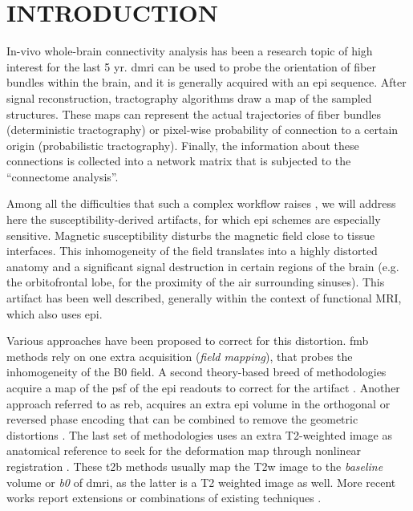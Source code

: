 \section{INTRODUCTION}
\label{sec:intro}
In-vivo whole-brain connectivity analysis has been a research topic of high
  interest for the last 5 yr.
\Gls*{dmri} can be used to probe the orientation of fiber bundles within the
  brain, and it is generally acquired with an \gls*{epi} sequence.
After signal reconstruction, tractography algorithms draw a map of the sampled
  structures.
These maps can represent the actual trajectories of fiber bundles
  (deterministic tractography) or pixel-wise probability of connection
  to a certain origin (probabilistic tractography).
Finally, the information about these connections is collected into a network
  matrix that is subjected to the ``connectome analysis''.

Among all the difficulties that such a complex workflow raises \cite{jones_twenty-five_2010},
  we will address here the susceptibility-derived artifacts,
  for which \Gls*{epi} schemes are especially sensitive.
Magnetic susceptibility disturbs the magnetic field close to tissue interfaces.
This inhomogeneity of the field translates into a highly distorted anatomy
  and a significant signal destruction in certain regions of the brain 
  (e.g. the orbitofrontal lobe, for the proximity of the air surrounding sinuses).
This artifact has been well described, generally within the context of functional MRI,
  which also uses \gls*{epi}.

Various approaches have been proposed to correct for this distortion.
\Gls*{fmb} methods \cite{jezzard_correction_1995} rely on one extra
  acquisition (\emph{field mapping}), that probes the inhomogeneity of the
  B0 field.
A second theory-based breed of methodologies acquire a map of the \acrlong*{psf}
  of the \gls*{epi} readouts to correct for the artifact \cite{robson_measurement_1997}.
Another approach referred to as \gls*{reb}, acquires an extra \gls*{epi} volume in the
  orthogonal or reversed phase encoding that can be combined to remove the geometric
  distortions \cite{cordes_geometric_2000,chiou_simple_2000}.
The last set of methodologies uses an extra T2-weighted image as anatomical reference
  to seek for the deformation map through nonlinear registration 
  \cite{kybic_unwarping_2000,studholme_accurate_2000}.
These \gls*{t2b} methods usually map the T2w image to the \emph{baseline} volume or
  \textit{b0} of \gls*{dmri}, as the latter is a T2 weighted image as well.
More recent works report extensions or combinations of existing techniques 
  \cite{andersson_how_2003,zaitsev_point_2004,%
  holland_efficient_2010,andersson_comprehensive_2012}.

